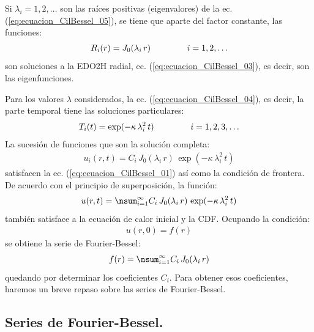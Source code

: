 Si $\lambda_{i} = 1, 2, \ldots$ son las raíces positivas (eigenvalores) de la ec. (\ref{eq:ecuacion_CilBessel_05}), se tiene que aparte del factor constante, las funciones:
\begin{align*}
R_{i}(r) = J_{0} (\lambda_{i} \, r) \hspace{1.5cm} i = 1, 2, \ldots
\end{align*}
son soluciones a la EDO2H radial, ec. (\ref{eq:ecuacion_CilBessel_03}), es decir, son las eigenfunciones.
\par
Para los valores $\lambda$ considerados, la ec. (\ref{eq:ecuacion_CilBessel_04}), es decir, la parte temporal tiene las soluciones particulares:
\begin{align*}
T_{i} (t) = \exp(-\kappa \, \lambda_{i}^{2} \, t) \hspace{1.5cm} i = 1, 2, 3, \ldots
\end{align*}
La sucesión de funciones que son la solución completa:
\begin{align*}
u_{i}(r, t) = C_{i} \, J_{0} (\lambda_{i} \, r) \, \exp(-\kappa \, \lambda_{i}^{2} \, t) 
\end{align*}
satisfacen la ec. (\ref{eq:ecuacion_CilBessel_01}) así como la condición de frontera. De acuerdo con el principio de superposición, la función:
\begin{align}
u(r, t) = \nsum_{i=1}^{\infty} C_{i} \, J_{0} (\lambda_{i} \, r) \, \exp(-\kappa \, \lambda_{i}^{2} \, t)
\label{eq:ecuacion_CilBessel_06}
\end{align}
también satisface a la ecuación de calor inicial y la CDF. Ocupando la condición:
\begin{align*}
u(r, 0) = f(r)
\end{align*}
se obtiene la serie de Fourier-Bessel:
\begin{align}
f(r) = \nsum_{i=1}^{\infty} C_{i} \, J_{0}(\lambda_{i} \, r)
\label{eq:ecuacion_CilBessel_07}
\end{align}
quedando por determinar los coeficientes $C_{i}$.  Para obtener esos coeficientes, haremos un breve repaso sobre las series de Fourier-Bessel.

\subsection{Series de Fourier-Bessel.}

